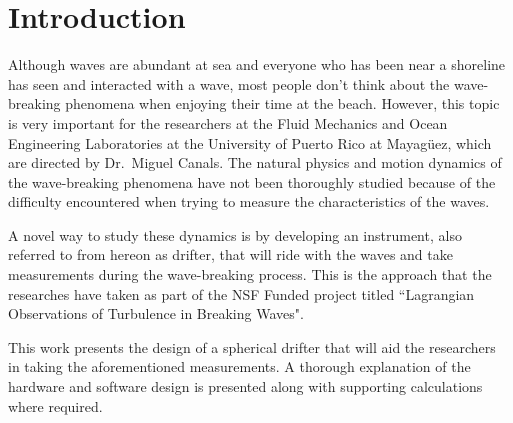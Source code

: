 \section{Introduction}

Although waves are abundant at sea and everyone who has been near a shoreline has seen and interacted with a wave, most people don't think about the wave-breaking phenomena when enjoying their time at the beach.  However, this topic is very important for the researchers at the Fluid Mechanics and Ocean Engineering Laboratories at the University of Puerto Rico at Mayag\"uez, which are directed by Dr.~Miguel Canals.  The natural physics and motion dynamics of the wave-breaking phenomena have not been thoroughly studied because of the difficulty encountered when trying to measure the characteristics of the waves.

A novel way to study these dynamics is by developing an instrument, also referred to from hereon as drifter, that will ride with the waves and take measurements during the wave-breaking process.  This is the approach that the researches have taken as part of the NSF Funded project titled ``Lagrangian Observations of Turbulence in Breaking Waves".

This work presents the design of a spherical drifter that will aid the researchers in taking the aforementioned measurements. A thorough explanation of the hardware and software design is presented along with supporting calculations where required.

